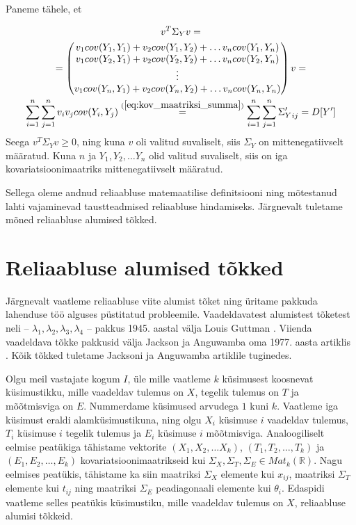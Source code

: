 \documentclass[a4paper,12pt,oneside]{article}
\numberwithin{equation}{section}
\theoremstyle{definition}
\begin{document}
Paneme tähele, et 

\begin{gather*}
v^T \Sigma_Y v = \\
= \begin{pmatrix}
v_1 cov(Y_1,Y_1) + v_2 cov(Y_1,Y_2) + \hdots v_n cov(Y_1,Y_n) \\
v_1 cov(Y_2,Y_1) + v_2 cov(Y_2,Y_2) + \hdots v_n cov(Y_2,Y_n) \\
\vdots \\
v_1 cov(Y_n,Y_1) + v_2 cov(Y_n,Y_2) + \ldots v_n cov(Y_n,Y_n) \\
\end{pmatrix} v = \\  \sum \limits_{i=1}^n \sum \limits_{j=1}^n v_i v_j cov(Y_i,Y_j)  \overset{(\ref{eq:kov_maatriksi_summa})}{=} \sum \limits_{i=1}^n \sum \limits_{j=1}^n {\Sigma_Y'}_{ij} = D[Y']
\end{gather*}
Seega $v^T \Sigma_Y v \geq 0$, ning kuna $v$ oli valitud suvaliselt, siis  $\Sigma_Y$ on mittenegatiivselt määratud. Kuna $n$ ja $Y_1,Y_2,\ldots Y_n$ olid valitud suvaliselt, siis on iga kovariatsioonimaatriks mittenegatiivselt määratud. 

Sellega oleme andnud reliaabluse matemaatilise definitsiooni ning mõtestanud lahti vajaminevad taustteadmised reliaabluse hindamiseks. Järgnevalt tuletame mõned reliaabluse alumised tõkked.   

  
\pagebreak


\section{Reliaabluse alumised tõkked}

Järgnevalt vaatleme reliaabluse viite alumist tõket  ning üritame pakkuda lahenduse töö alguses püstitatud probleemile. Vaadeldavatest alumistest tõketest neli -- $\lambda_1,\lambda_2,\lambda_3,\lambda_4$ -- pakkus  1945. aastal välja Louis Guttman \cite{Guttman1945}. Viienda vaadeldava tõkke pakkusid välja Jackson ja Anguwamba oma 1977. aasta artiklis \cite{Jackson1977}. Kõik tõkked tuletame  Jacksoni ja Anguwamba artiklile tuginedes.

Olgu meil vastajate kogum $I$, üle mille vaatleme $k$ küsimusest koosnevat küsimus\-tikku, mille vaadeldav tulemus on $X$, tegelik tulemus on $T$ ja mõõtmisviga on $E$. Nummerdame küsimused arvudega $1$ kuni $k$. Vaatleme iga küsimust eraldi alam\-küsimustikuna, ning olgu $X_i$ küsimuse $i$ vaadeldav tulemus, $T_i$ küsimuse $i$ tegelik tulemus ja $E_i$ küsimuse $i$ mõõtmisviga. Analoogiliselt eelmise peatükiga tähistame vektorite $(X_1,X_2,\ldots X_k)$, $(T_1,T_2,\ldots,T_k)$ ja $(E_1,E_2,\ldots,E_k)$ kovariatsioonimaatrikseid kui $\Sigma_X,\Sigma_T,\Sigma_E \in Mat_{k}\left(\mathbb{R}\right)$. Nagu eelmises peatükis, tähistame ka siin maatriksi $\Sigma_X$ elemente kui $x_{ij}$, maatriksi $\Sigma_T$ elemente kui $t_{ij}$ ning maatriksi $\Sigma_E$ peadiagonaali elemente kui $\theta_i$. Edaspidi vaatleme selles peatükis küsimustiku, mille vaadeldav tulemus on $X$, reliaabluse alumisi tõkkeid.
\end{document}
